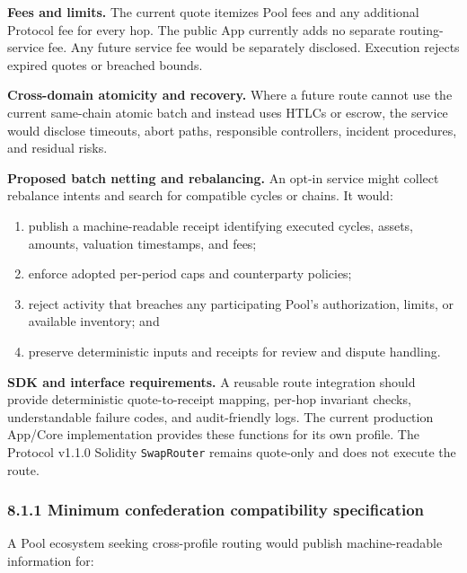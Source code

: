 \documentclass[11pt]{article}
\begin{document}
\textbf{Fees and limits.} The current quote itemizes Pool fees and any additional Protocol fee for every hop. The public App currently adds no separate routing-service fee. Any future service fee would be separately disclosed. Execution rejects expired quotes or breached bounds.

\textbf{Cross-domain atomicity and recovery.} Where a future route cannot use the current same-chain atomic batch and instead uses HTLCs or escrow, the service would disclose timeouts, abort paths, responsible controllers, incident procedures, and residual risks.

\textbf{Proposed batch netting and rebalancing.} An opt-in service might collect rebalance intents and search for compatible cycles or chains. It would:

\begin{enumerate}[leftmargin=*]
\item publish a machine-readable receipt identifying executed cycles, assets, amounts, valuation timestamps, and fees;
\item enforce adopted per-period caps and counterparty policies;
\item reject activity that breaches any participating Pool's authorization, limits, or available inventory; and
\item preserve deterministic inputs and receipts for review and dispute handling.
\end{enumerate}
\textbf{SDK and interface requirements.} A reusable route integration should provide deterministic quote-to-receipt mapping, per-hop invariant checks, understandable failure codes, and audit-friendly logs. The current production App/Core implementation provides these functions for its own profile. The Protocol v1.1.0 Solidity \texttt{SwapRouter} remains quote-only and does not execute the route.

\subsubsection*{8.1.1 Minimum confederation compatibility specification}

A Pool ecosystem seeking cross-profile routing would publish machine-readable information for:
\end{document}
